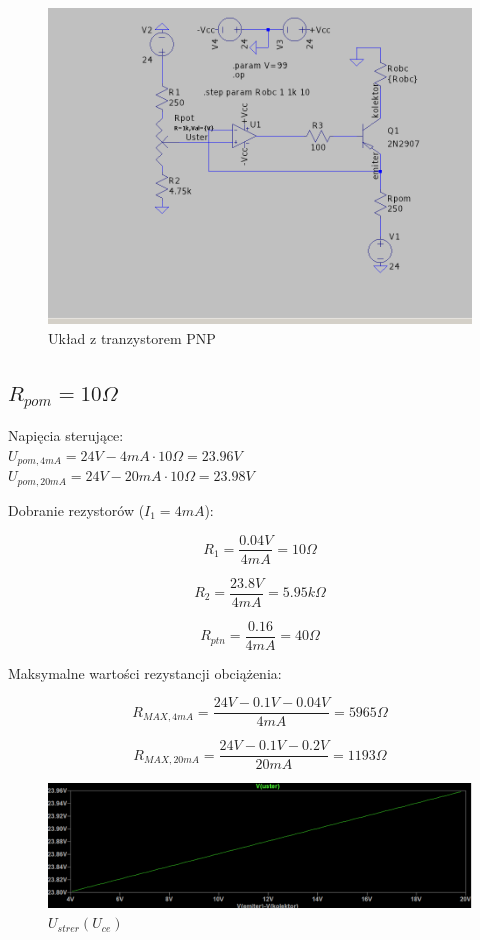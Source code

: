 \documentclass{article}
\begin{document}
\begin{figure}[h!]
    \includegraphics[scale=0.3]{schemat2.png}
    \caption{Układ z tranzystorem PNP}
\end{figure}

\subsection{$R_{pom}=10\Omega$}

Napięcia sterujące:\\
$U_{pom, 4mA}=24V-4mA\cdot 10\Omega=23.96V$\\
$U_{pom, 20mA}=24V-20mA\cdot 10\Omega=23.98V$

Dobranie rezystorów ($I_{1}=4mA$):

$$
    R_{1}=\frac{0.04V}{4mA}=10\Omega
$$

$$
    R_{2}=\frac{23.8V}{4mA}=5.95k\Omega
$$

$$
    R_{ptn}=\frac{0.16}{4mA}=40\Omega
$$

Maksymalne wartości rezystancji obciążenia:

$$
    R_{MAX, 4mA}=\frac{24V-0.1V-0.04V}{4mA}=5965\Omega
$$

$$
    R_{MAX, 20mA}=\frac{24V-0.1V-0.2V}{20mA}=1193\Omega
$$


\begin{figure}[h!]
    \includegraphics[scale=0.3]{p10.png}
    \centering
    \caption{$U_{strer}(U_{ce})$}
\end{figure}
\end{document}
